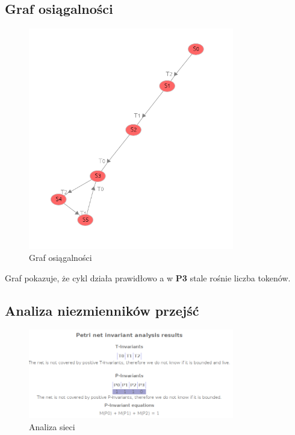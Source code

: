 \documentclass{article}
\begin{document}
\subsection{Graf osiągalności}
\begin{figure}[H]
    \centering
    \includegraphics[width=0.8\textwidth, height=0.6\textheight]{zad1_graph.png}
    \caption{Graf osiągalności}
\end{figure}

Graf pokazuje, że cykl działa prawidłowo a w \textbf{P3} stale rośnie liczba tokenów.

\subsection{Analiza niezmienników przejść}

\begin{figure}[H]
    \centering
    \includegraphics[width=0.8\textwidth, height=0.4\textheight]{zad1_analiza.png}
    \caption{Analiza sieci}
\end{figure}
\end{document}
